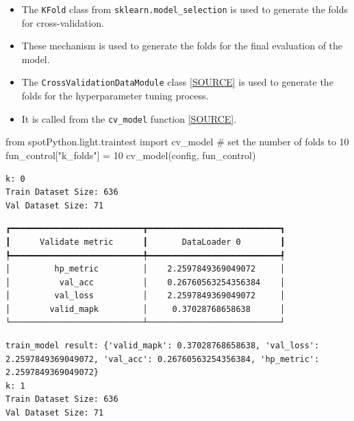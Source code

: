 \documentclass[
  letterpaper,
  DIV=11,
  numbers=noendperiod]{scrreprt}
\newenvironment{Shaded}{\begin{snugshade}}{\end{snugshade}}
\newcommand{\CommentTok}[1]{\textcolor[rgb]{0.37,0.37,0.37}{#1}}
\newcommand{\DecValTok}[1]{\textcolor[rgb]{0.68,0.00,0.00}{#1}}
\newcommand{\ImportTok}[1]{\textcolor[rgb]{0.00,0.46,0.62}{#1}}
\newcommand{\NormalTok}[1]{\textcolor[rgb]{0.00,0.23,0.31}{#1}}
\newcommand{\OperatorTok}[1]{\textcolor[rgb]{0.37,0.37,0.37}{#1}}
\newcommand{\StringTok}[1]{\textcolor[rgb]{0.13,0.47,0.30}{#1}}
\providecommand{\tightlist}{%
  \setlength{\itemsep}{0pt}\setlength{\parskip}{0pt}}\usepackage{longtable,booktabs,array}
\begin{document}
\begin{itemize}
\tightlist
\item
  The \texttt{KFold} class from \texttt{sklearn.model\_selection} is
  used to generate the folds for cross-validation.
\item
  These mechanism is used to generate the folds for the final evaluation
  of the model.
\item
  The \texttt{CrossValidationDataModule} class
  \href{https://github.com/sequential-parameter-optimization/spotPython/blob/main/src/spotPython/light/crossvalidationdatamodule.py}{{[}SOURCE{]}}
  is used to generate the folds for the hyperparameter tuning process.
\item
  It is called from the \texttt{cv\_model} function
  \href{https://github.com/sequential-parameter-optimization/spotPython/blob/main/src/spotPython/light/traintest.py}{{[}SOURCE{]}}.
\end{itemize}

\begin{Shaded}
\begin{Highlighting}[]
\ImportTok{from}\NormalTok{ spotPython.light.traintest }\ImportTok{import}\NormalTok{ cv\_model}
\CommentTok{\# set the number of folds to 10}
\NormalTok{fun\_control[}\StringTok{"k\_folds"}\NormalTok{] }\OperatorTok{=} \DecValTok{10}
\NormalTok{cv\_model(config, fun\_control)}
\end{Highlighting}
\end{Shaded}

\begin{verbatim}
k: 0
Train Dataset Size: 636
Val Dataset Size: 71
\end{verbatim}

\begin{verbatim}
┏━━━━━━━━━━━━━━━━━━━━━━━━━━━┳━━━━━━━━━━━━━━━━━━━━━━━━━━━┓
┃      Validate metric      ┃       DataLoader 0        ┃
┡━━━━━━━━━━━━━━━━━━━━━━━━━━━╇━━━━━━━━━━━━━━━━━━━━━━━━━━━┩
│         hp_metric         │    2.2597849369049072     │
│          val_acc          │    0.26760563254356384    │
│         val_loss          │    2.2597849369049072     │
│        valid_mapk         │     0.37028768658638      │
└───────────────────────────┴───────────────────────────┘
\end{verbatim}

\begin{verbatim}
train_model result: {'valid_mapk': 0.37028768658638, 'val_loss': 2.2597849369049072, 'val_acc': 0.26760563254356384, 'hp_metric': 2.2597849369049072}
k: 1
Train Dataset Size: 636
Val Dataset Size: 71
\end{verbatim}
\end{document}
